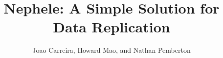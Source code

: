 \documentclass[final,hyperref={pdfpagelabels=false},xcolor=table]{beamer}
\title{Nephele: A Simple Solution for Data Replication}
\author{Joao Carreira, Howard Mao, and Nathan Pemberton}
\institute[UC Berkeley]{\textsc{University of California, Berkeley}}
\begin{document}
\begin{frame}
\vspace{-1.5em}
\begin{columns}[t]
	\begin{column}{0.3\linewidth}
            
            \vspace{1ex}
            
            \vspace{1ex}
            
	\end{column}

	\begin{column}{0.3\linewidth}
            
	\end{column}

	\begin{column}{0.3\linewidth}
	\end{column}
\end{columns}
\end{frame}
\end{document}
